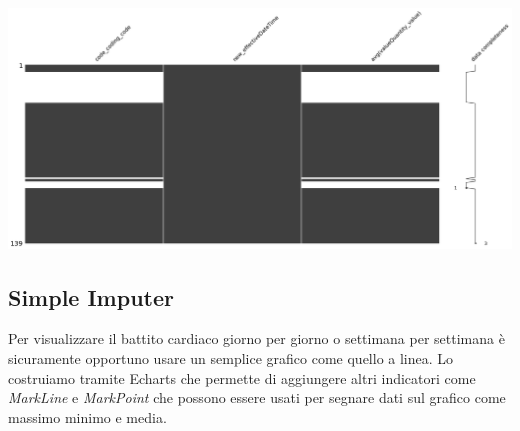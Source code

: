\documentclass[11pt, oneside]{article}
\begin{document}
\begin{center}
\includegraphics[scale=0.2]{2_msn_df2.png}
\end{center}

\subsection{Simple Imputer}

Per visualizzare il battito cardiaco giorno per giorno o settimana per settimana è sicuramente opportuno usare un semplice grafico come quello a linea. Lo costruiamo tramite Echarts che permette di aggiungere altri indicatori come \emph{MarkLine} e \emph{MarkPoint} che possono essere usati per segnare dati sul grafico come massimo minimo e media.
\end{document}

